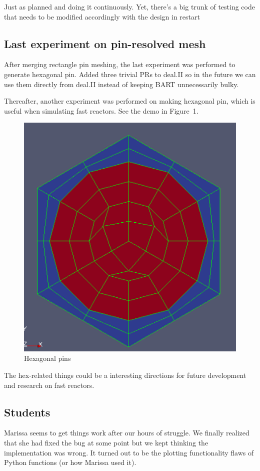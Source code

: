 \documentclass{article}
\begin{document}
Just as planned and doing it continuously. Yet, there's a big trunk of 
testing code that needs to be modified accordingly with the design in restart

\subsection{Last experiment on pin-resolved mesh}
After merging rectangle pin meshing, the last experiment was performed to generate hexagonal pin. Added three trivial PRs to deal.II so in the future we can use them directly from deal.II instead of keeping BART unnecessarily bulky. 

Thereafter, another experiment was performed on making hexagonal pin, which is useful when simulating fast reactors. See the demo in Figure\ 1.

\begin{figure}
	\centering
	\includegraphics[scale=0.35]{hex-pin}
	\caption{Hexagonal pins}
\end{figure}

The hex-related things could be a interesting directions for future development and research on fast reactors.

\subsection{Students}
Marissa seems to get things work after our hours of struggle. We finally realized that she had fixed the bug at some point but we kept thinking the implementation was wrong. It turned out to be the plotting functionality flaws of Python functions (or how Marissa used it).
\end{document}
